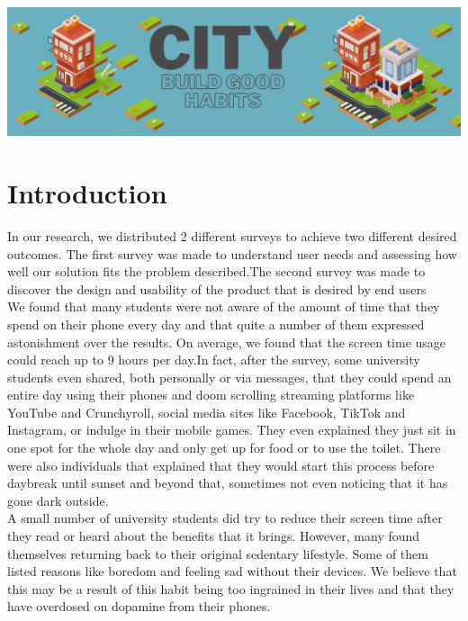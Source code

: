 \documentclass[sigconf, 11pt]{acmart}
\begin{document}
\begin{teaserfigure}
  \includegraphics[width=\textwidth]{images/City Banner.jpg}
  \vspace{0.2}
\end{teaserfigure}

\maketitle


\section{Introduction}
In our research, we distributed 2 different surveys to achieve two different desired outcomes. The first survey was made to understand user needs and assessing how well our solution fits the problem described.The second survey was made to discover the design and usability of the product that is desired by end users
\\

We found that many students were not aware of the amount of time that they spend on their phone every day and that quite a number of them expressed astonishment over the results. On average, we found that the screen time usage could reach up to 9 hours per day.In fact, after the survey, some university students even shared, both personally or via messages,  that they could spend an entire day using their phones and doom scrolling streaming platforms like YouTube and Crunchyroll, social media sites like Facebook, TikTok and Instagram, or indulge in their mobile games. They even explained they just sit in one spot for the whole day and only get up for food or to use the toilet. There were also individuals that explained that they would start this process before daybreak until sunset and beyond that, sometimes not even noticing that it has gone dark outside. 
\\

A small number of university students did try to reduce their screen time after they read or heard about the benefits that it brings. However, many found themselves returning back to their original sedentary lifestyle. Some of them listed reasons like boredom and feeling sad without their devices. We believe that this may be a result of this habit being too ingrained in their lives and that they have overdosed on dopamine from their phones.
\\
\end{document}
